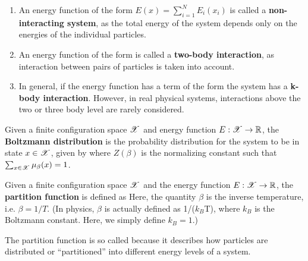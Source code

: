 \documentclass[letterpaper,english,10pt]{article}
\begin{document}
\begin{itemize}
\begin{exmp}
\begin{enumerate}
\item 
An energy function of the form
$E(x)=\sum_{i=1}^{N} E_i(x_i)$
is called a \textbf{non-interacting system}, as the total energy of the system depends only on the energies of the individual particles. 
\item An energy function of the form  
is called a \textbf{two-body interaction}, as interaction between pairs of particles is taken into account. 
\item In general, if the energy function has a term of the form 
the system has a \textbf{k-body interaction}. 
However, in real physical systems, interactions above the two or three body level are rarely considered. 
\end{enumerate}
\end{exmp}
\end{itemize}
\begin{defn} 
Given a finite configuration space $\mathscr{X}$ and energy function $E: \mathscr{X} \to \mathbb{R}$, 
the \textbf{Boltzmann distribution} is the probability distribution for the system to be in state $x \in \mathscr{X}$, 
given by
where $Z(\beta)$ is the normalizing constant such that $\sum_{x \in \mathscr{X}} \mu_{\beta}(x)=1$.
\end{defn}
\begin{defn}
Given a finite configuration space $\mathscr{X}$ and the energy function $E : \mathscr{X} \to \mathbb{R}$, 
the \textbf{partition function} is defined as
Here, the quantity $\beta$ is the inverse temperature, i.e. $\beta=1/T$. 
(In physics, $\beta$ is actually defined as 1/($k_B$T), where $k_B$ is the Boltzmann constant. Here, we simply define $k_B=1$.)
\end{defn}
The partition function is so called because it describes how particles are distributed or ``partitioned'' into different energy levels of a system.
\end{document}
